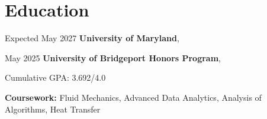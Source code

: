 \section{Education}
    \begin{twocolentry}{
        Expected May 2027
    }
        \textbf{University of Maryland}, \\
    \end{twocolentry}

    \begin{twocolentry}{
        May 2025
    }
        \textbf{University of Bridgeport Honors Program}, 
    \end{twocolentry}

    \vspace{0.10 cm}
    \begin{onecolentry}
        \begin{highlights}
            \item Cumulative GPA: 3.692/4.0
            \item \textbf{Coursework:} Fluid Mechanics, Advanced Data Analytics, Analysis of Algorithms, Heat Transfer
        \end{highlights}
    \end{onecolentry}